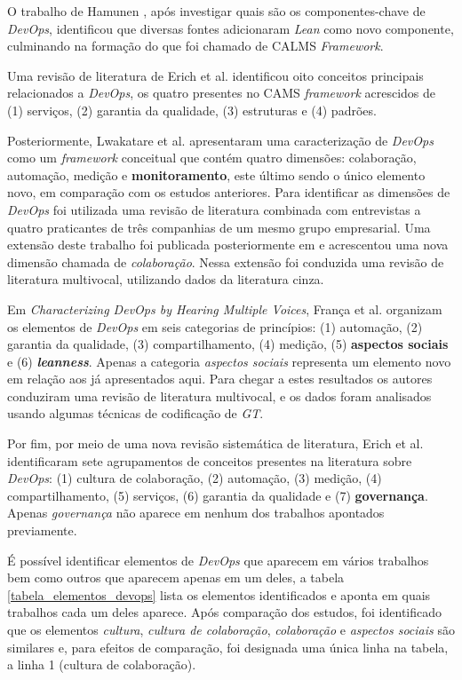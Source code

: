 O trabalho de Hamunen \cite{challenges_in_adopting_devops}, após
investigar quais são os componentes-chave de {\it DevOps}, identificou que
diversas fontes adicionaram {\it Lean} como novo componente, culminando
na formação do que foi chamado de CALMS \textit{Framework}.

Uma revisão de literatura de Erich et al. \cite{cooperation_dev_ops_esem_2014}
identificou oito conceitos principais relacionados a \textit{DevOps}, os quatro
presentes no \acrshort{CAMS} \textit{framework} acrescidos de (1) serviços,
(2) garantia da qualidade, (3) estruturas e (4) padrões.

Posteriormente, Lwakatare et al. \cite{dimensions_of_devops} apresentaram uma
caracterização de \textit{DevOps} como um \textit{framework} conceitual que
contém quatro dimensões: colaboração, automação, medição e
\textbf{monitoramento}, este último sendo o único elemento novo, em comparação
com os estudos anteriores. Para identificar as dimensões de \textit{DevOps} foi
utilizada uma revisão de literatura combinada com entrevistas a quatro
praticantes de três companhias de um mesmo grupo empresarial. Uma extensão
deste trabalho foi publicada posteriormente em \cite{extending_dimensions} e
acrescentou uma nova dimensão chamada de \emph{colaboração}. Nessa extensão foi
conduzida uma revisão de literatura multivocal, utilizando dados da literatura
cinza.

Em \emph{Characterizing DevOps by Hearing Multiple Voices}, França et al.
\cite{characterizing_devops} organizam os elementos de \textit{DevOps} em seis
categorias de princípios: (1) automação, (2) garantia da qualidade,
(3) compartilhamento, (4) medição, (5) \textbf{aspectos sociais} e (6)
\textbf{\textit{leanness}}. Apenas a categoria \emph{aspectos sociais}
representa um elemento novo em relação aos já apresentados aqui. Para
chegar a estes resultados os autores conduziram uma revisão de literatura
multivocal, e os dados foram analisados usando algumas técnicas de
codificação de \textit{\acrfull{GT}}.

Por fim, por meio de uma nova revisão sistemática de literatura, Erich et al.
\cite{qualitative_devops_journalsw_17} identificaram sete agrupamentos de
conceitos presentes na literatura sobre \textit{DevOps}: (1) cultura de
colaboração, (2) automação, (3) medição, (4) compartilhamento, (5) serviços,
(6) garantia da qualidade e (7) \textbf{governança}. Apenas \emph{governança}
não aparece em nenhum dos trabalhos apontados previamente.

É possível identificar elementos de \textit{DevOps} que aparecem em vários
trabalhos bem como outros que aparecem apenas em um deles, a tabela
\ref{tabela_elementos_devops} lista os elementos identificados e aponta em
quais trabalhos cada um deles aparece. Após comparação dos estudos, foi
identificado que os elementos \emph{cultura}, \emph{cultura de colaboração},
\emph{colaboração} e \emph{aspectos sociais} são similares e, para efeitos de
comparação, foi designada uma única linha na tabela, a linha 1 (cultura de
colaboração).

